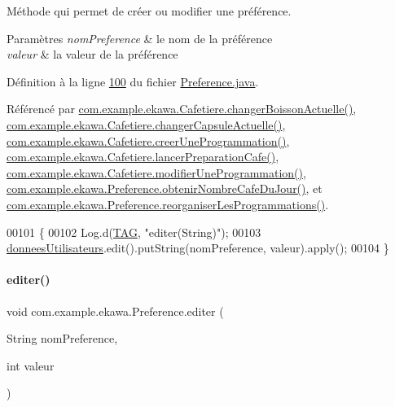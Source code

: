 Méthode qui permet de créer ou modifier une préférence. 


\begin{DoxyParams}{Paramètres}
{\em nom\+Preference} & le nom de la préférence \\
\hline
{\em valeur} & la valeur de la préférence \\
\hline
\end{DoxyParams}


Définition à la ligne \hyperlink{_preference_8java_source_l00100}{100} du fichier \hyperlink{_preference_8java_source}{Preference.\+java}.



Référencé par \hyperlink{_cafetiere_8java_source_l00224}{com.\+example.\+ekawa.\+Cafetiere.\+changer\+Boisson\+Actuelle()}, \hyperlink{_cafetiere_8java_source_l00212}{com.\+example.\+ekawa.\+Cafetiere.\+changer\+Capsule\+Actuelle()}, \hyperlink{_cafetiere_8java_source_l00731}{com.\+example.\+ekawa.\+Cafetiere.\+creer\+Une\+Programmation()}, \hyperlink{_cafetiere_8java_source_l00527}{com.\+example.\+ekawa.\+Cafetiere.\+lancer\+Preparation\+Cafe()}, \hyperlink{_cafetiere_8java_source_l00775}{com.\+example.\+ekawa.\+Cafetiere.\+modifier\+Une\+Programmation()}, \hyperlink{_preference_8java_source_l00063}{com.\+example.\+ekawa.\+Preference.\+obtenir\+Nombre\+Cafe\+Du\+Jour()}, et \hyperlink{_preference_8java_source_l00157}{com.\+example.\+ekawa.\+Preference.\+reorganiser\+Les\+Programmations()}.


\begin{DoxyCode}
00101     \{
00102         Log.d(\hyperlink{classcom_1_1example_1_1ekawa_1_1_preference_aeb5e1e787153c37929839622ac5d0339}{TAG}, \textcolor{stringliteral}{"editer(String)"});
00103         \hyperlink{classcom_1_1example_1_1ekawa_1_1_preference_a5ac49439bd1c8c3ff12dd9eb2475b894}{donneesUtilisateurs}.edit().putString(nomPreference, valeur).apply();
00104     \}
\end{DoxyCode}
\mbox{\label{classcom_1_1example_1_1ekawa_1_1_preference_a7c14e4d338ffca5c03fda6b16289d8ce}} 
\paragraph{\texorpdfstring{editer()}{editer()}\hspace{0.1cm}{\footnotesize\ttfamily [2/3]}}
{\footnotesize\ttfamily void com.\+example.\+ekawa.\+Preference.\+editer (\begin{DoxyParamCaption}\item[{String}]{nom\+Preference,  }\item[{int}]{valeur }\end{DoxyParamCaption})}



